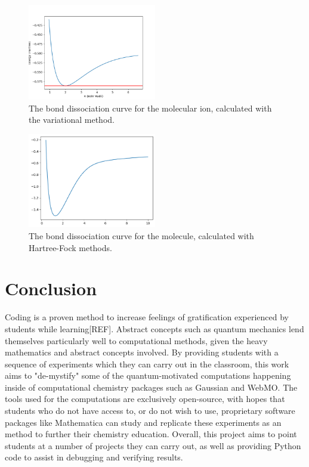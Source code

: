 \documentclass{achemso}
\begin{document}
\begin{figure}[H]
  \includegraphics[width=0.5\textwidth]{figures/variational_dissociation.png}
  \caption{The bond dissociation curve for the  molecular ion, calculated with the variational method.}
\end{figure}
\begin{figure}[H]
  \includegraphics[width=0.5\textwidth]{figures/Bond_Dissociation_Hydrogen.png}
  \caption{The bond dissociation curve for the  molecule, calculated with Hartree-Fock methods.}
\end{figure}

\section{Conclusion}
Coding is a proven method to increase feelings of gratification experienced by students while learning[REF].  Abstract concepts such as quantum mechanics lend themselves particularly well to computational methods, given the heavy mathematics and abstract concepts involved.  By providing students with a sequence of experiments which they can carry out in the classroom, this work aims to "de-mystify" some of the quantum-motivated computations happening inside of computational chemistry packages such as Gaussian and WebMO. The tools used for the computations are exclusively open-source, with hopes that students who do not have access to, or do not wish to use, proprietary software packages like Mathematica can study and replicate these experiments as an method to further their chemistry education. Overall, this project aims to point students at a number of projects they can carry out, as well as providing Python code to assist in debugging and verifying results. 
\end{document}
